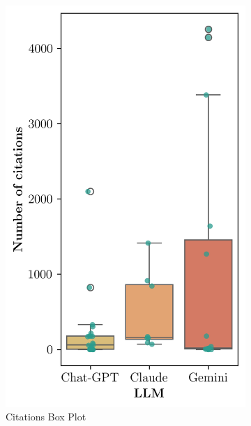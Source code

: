 \documentclass[runningheads]{llncs}
\begin{document}
\begin{figure}[htbp]
\begin{subfigure}[b]{0.32\textwidth}
        \includegraphics[width=\linewidth]{figures/citations_box_plot.png}
        \caption{Citations Box Plot}
        \label{fig:citations_box_plot}
    \end{subfigure}
    \begin{subfigure}[b]{0.32\textwidth}
        \centering

\end{subfigure}
\end{figure}
\end{document}
